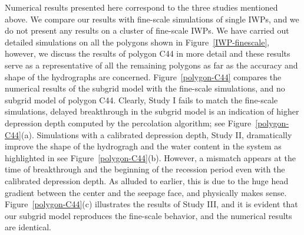 \documentclass[review,11pt]{elsarticle}
\begin{document}
Numerical results presented here correspond to the three studies mentioned above. We compare our results with fine-scale simulations of single IWPs, and we do not present any results on a cluster of fine-scale IWPs. We have carried out detailed simulations on all the polygons shown in Figure~\ref{IWP-finescale}, however, we discuss the results of polygon C44 in more detail and these results serve as a representative of all the remaining polygons as far as the accuracy and shape of the hydrographs are concerned. Figure~\ref{polygon-C44} compares the numerical results of the subgrid model with the fine-scale simulations, and no subgrid model of polygon C44. Clearly, Study I fails to match the fine-scale simulations, delayed breakthrough in the subgrid model is an indication of higher depression depth computed by the percolation algorithm; see Figure~\ref{polygon-C44}(a). Simulations with a calibrated depression depth, Study II, dramatically improve the shape of the hydrogragh and the water content in the system as highlighted in see Figure~\ref{polygon-C44}(b). However, a mismatch appears at the time of breakthrough and the beginning of the recession period even with the calibrated depression depth. As alluded to earlier, this is due to the huge head gradient between the center and the seepage face, and physically makes sense. Figure~\ref{polygon-C44}(c) illustrates the results of Study III, and it is evident that our subgrid model reproduces the fine-scale behavior, and the numerical results are identical.
\end{document}
